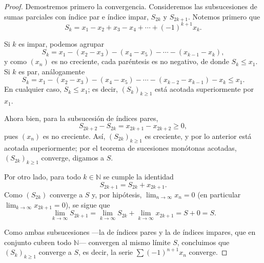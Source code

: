 \documentclass[12pt,a4paper]{article}
\begin{document}
    \begin{proof}
        Demostremos primero la convergencia. Consideremos las subsucesiones de sumas parciales con
        índice par e índice impar, $S_{2k}$ y $S_{2k+1}$. Notemos primero que
        \begin{equation*}
            S_k = x_1-x_2+x_3-x_4+\cdots+(-1)^{k+1}x_k.
        \end{equation*}

        Si $k$ es impar, podemos agrupar
        \begin{equation*}
            S_k = x_1-(x_2-x_3)-(x_4-x_5)-\cdots-(x_{k-1}-x_k),
        \end{equation*}
        y como $(x_n)$ es no creciente, cada paréntesis es no negativo, de donde $S_k\le x_1$. Si $k$
        es par, análogamente
        \begin{equation*}
            S_k = x_1-(x_2-x_3)-(x_4-x_5)-\cdots-(x_{k-2}-x_{k-1})-x_k \le x_1.
        \end{equation*}
        En cualquier caso, $S_k\le x_1$; es decir, $(S_k)_{k\ge1}$ está acotada superiormente por $x_1$.

        Ahora bien, para la subsucesión de índices pares,
        \begin{equation*}
            S_{2k+2}-S_{2k}=x_{2k+1}-x_{2k+2}\ge 0,
        \end{equation*}
        pues $(x_n)$ es no creciente. Así, $(S_{2k})_{k\ge1}$ es creciente, y por lo anterior está
        acotada superiormente; por el teorema de sucesiones monótonas acotadas, $(S_{2k})_{k\ge1}$
        converge, digamos a $S$.

        Por otro lado, para todo $k\in\mathbb{N}$ se cumple la identidad
        \begin{equation*}
            S_{2k+1}=S_{2k}+x_{2k+1}.
        \end{equation*}
        Como $(S_{2k})$ converge a $S$ y, por hipótesis, $\lim_{n\to\infty}x_n=0$ (en particular
        $\lim_{k\to\infty}x_{2k+1}=0$), se sigue que
        \begin{equation*}
            \lim_{k\to\infty} S_{2k+1}=\lim_{k\to\infty}S_{2k}+\lim_{k\to\infty}x_{2k+1}=S+0=S.
        \end{equation*}

        Como ambas subsucesiones —la de índices pares y la de índices impares, que en conjunto
        cubren todo $\mathbb{N}$— convergen al mismo límite $S$, concluimos que $(S_k)_{k\ge1}$
        converge a $S$, es decir, la serie $\sum(-1)^{n+1}x_n$ converge.


\end{proof}
\end{document}
